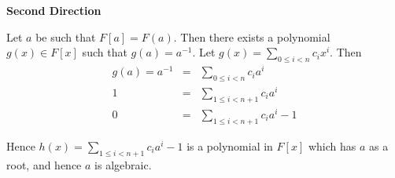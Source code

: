 \documentclass[11pt]{article} \usepackage{amssymb}
\begin{document}
\begin{enumerate}
    {\bf Second Direction}

    Let $a$ be such that $F[a]=F(a)$. Then there exists a polynomial 
    $g(x) \in F[x]$ such that $g(a)=a^{-1}$. Let $g(x)=\sum_{0\leq i < n}c_ix^i$. Then
    \begin{eqnarray*}
      g(a)=a^{-1}&=&\sum_{0\leq i < n}c_ia^i
      \\ 1 &=& \sum_{1\leq i < n + 1}c_ia^i
      \\ 0 &=& \sum_{1\leq i < n + 1}c_ia^i - 1
    \end{eqnarray*}
    
    Hence $h(x)=\sum_{1\leq i < n + 1}c_ia^i - 1$ is a polynomial in $F[x]$ which
    has $a$ as a root, and hence $a$ is algebraic.

\end{enumerate}
\end{document}
